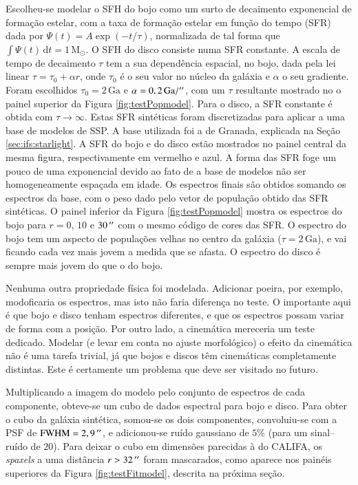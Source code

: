 Escolheu-se modelar o SFH do bojo como um surto de decaimento exponencial de
formação estelar, com a taxa de formação estelar em função do tempo (SFR) dada
por $\Psi(t) = A \exp (-t/\tau)$, normalizada de tal forma que $\int
\Psi(t)\,\mathrm{d}t = 1\,\mathrm{M}_\odot$. O SFH do disco consiste numa SFR
constante. A escala de tempo de decaimento $\tau$ tem a sua dependência
espacial, no bojo, dada pela lei linear $\tau = \tau_0 + \alpha r$, onde
$\tau_0$ é o seu valor no núcleo da galáxia e $\alpha$ o seu gradiente. Foram
escolhidos $\tau_0 = 2\,\mathrm{Ga}$ e $\alpha = 0,2\,\mathrm{Ga} / ^{\prime\prime}$, com
um $\tau$ resultante mostrado no o painel superior da Figura
\ref{fig:testPopmodel}. Para o disco, a SFR constante é obtida com
$\tau\to\infty$. Estas SFR sintéticas foram discretizadas para aplicar a uma
base de modelos de SSP. A base utilizada foi a de Granada, explicada na Seção
\ref{sec:ifs:starlight}. A SFR do bojo e do disco estão mostrados no painel
central da mesma figura, respectivamente em vermelho e azul. A forma das SFR
foge um pouco de uma exponencial devido ao fato de a base de modelos não ser
homogeneamente espaçada em idade. Os espectros finais são obtidos somando os
espectros da base, com o peso dado pelo vetor de população obtido das SFR
sintéticas. O painel inferior da Figura \ref{fig:testPopmodel} mostra os
espectros do bojo para $r = 0$, $10$ e $30\,^{\prime\prime}$ com o mesmo código de cores
das SFR. O espectro do bojo tem um aspecto de populações velhas no centro da
galáxia ($\tau = 2\,\mathrm{Ga}$), e vai ficando cada vez mais jovem a medida
que se afasta. O espectro do disco é sempre mais jovem do que o do bojo.

Nenhuma outra propriedade física foi modelada. Adicionar poeira, por exemplo,
modoficaria os espectros, mas isto não faria diferença no teste. O importante
aqui é que bojo e disco tenham espectros diferentes, e que os espectros possam
variar de forma com a posição. Por outro lado, a cinemática mereceria um teste
dedicado. Modelar (e levar em conta no ajuste morfológico) o efeito da
cinemática não é uma tarefa trivial, já que bojos e discos têm cinemáticas
completamente distintas. Este é certamente um problema que deve ser visitado no
futuro.

Multiplicando a imagem do modelo pelo conjunto de espectros de cada componente,
obteve-se um cubo de dados espectral para bojo e disco. Para obter o cubo da
galáxia sintética, somou-se os dois componentes, convoluiu-se com a PSF de
$\mathrm{FWHM} = 2,9\,^{\prime\prime}$, e adicionou-se ruído gaussiano de $5\%$ (para um
sinal--ruído de $20$). Para deixar o cubo em dimensões parecidas à do CALIFA, os
{\em spaxels} a uma distância $r > 32\,^{\prime\prime}$ foram mascarados, como aparece nos
painéis superiores da Figura \ref{fig:testFitmodel}, descrita na próxima seção.

